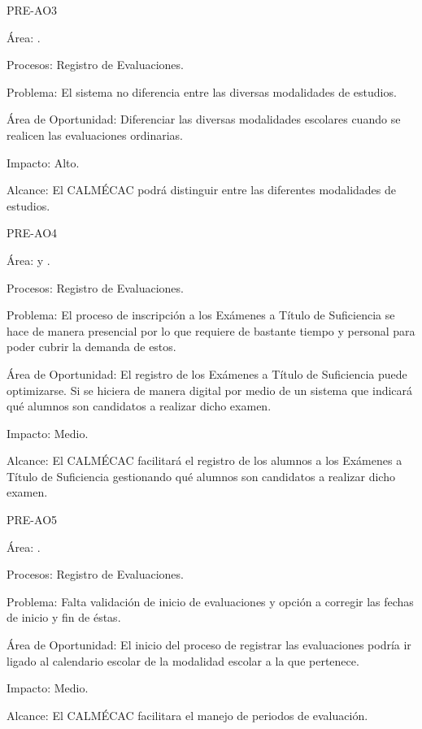 \begin{AreaOportunidad}{PRE-AO3}
	\item[Área:] .
	\item[Procesos:] Registro de Evaluaciones.
	\item[Problema:] El sistema no diferencia entre las diversas modalidades de estudios.
	\item[Área de Oportunidad:]Diferenciar las diversas modalidades escolares cuando se realicen las evaluaciones ordinarias.
	\item[Impacto:] Alto.
	\item[Alcance:] El CALMÉCAC podrá distinguir entre las diferentes modalidades de estudios.
\end{AreaOportunidad}


\begin{AreaOportunidad}{PRE-AO4}
	\item[Área:]  y .
	\item[Procesos:] Registro de Evaluaciones.
	\item[Problema:] El proceso de inscripción a los Exámenes a Título de Suficiencia se hace de manera presencial por lo que requiere de bastante tiempo y personal para poder cubrir la demanda de estos.
	\item[Área de Oportunidad:] El registro de los Exámenes a Título de Suficiencia puede optimizarse. Si se hiciera de manera digital por medio de un sistema que indicará qué alumnos son candidatos a realizar dicho examen.
	\item[Impacto:] Medio.
	\item[Alcance:] El CALMÉCAC facilitará el registro de los alumnos a los Exámenes a Título de Suficiencia gestionando qué alumnos son candidatos a realizar dicho examen.
\end{AreaOportunidad}


\begin{AreaOportunidad}{PRE-AO5}
	\item[Área:]  .
	\item[Procesos:] Registro de Evaluaciones.
	\item[Problema:] Falta validación de inicio de evaluaciones y opción a corregir las fechas de inicio y fin de éstas.
	\item[Área de Oportunidad:] El inicio del proceso de registrar las evaluaciones podría ir ligado al calendario escolar de la modalidad escolar a la que pertenece.  
	\item[Impacto:] Medio.
	\item[Alcance:] El CALMÉCAC facilitara el manejo de periodos de evaluación.
\end{AreaOportunidad}


